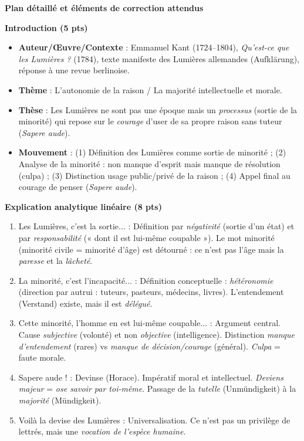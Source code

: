 \documentclass[11pt]{article}
\newcommand{\cle}[1]{{\popxbold\color{popdark}#1}}
\begin{document}
\begin{corrige} 
\textbf{Plan détaillé et éléments de correction attendus}

\textbf{Introduction (5 pts)}\par
\begin{itemize}
\item \textbf{Auteur/Œuvre/Contexte} : Emmanuel Kant (1724–1804), \emph{Qu'est-ce que les Lumières ?} (1784), texte manifeste des Lumières allemandes (Aufklärung), réponse à une revue berlinoise.
\item \textbf{Thème} : L'autonomie de la raison / La majorité intellectuelle et morale.
\item \textbf{Thèse} : Les Lumières ne sont pas une époque mais un \emph{processus} (sortie de la minorité) qui repose sur le \emph{courage} d'user de sa propre raison sans tuteur (\emph{Sapere aude}).
\item \textbf{Mouvement} : (1) Définition des Lumières comme sortie de minorité ; (2) Analyse de la minorité : non manque d'esprit mais manque de résolution (culpa) ; (3) Distinction usage public/privé de la raison ; (4) Appel final au courage de penser (\emph{Sapere aude}).
\end{itemize}

\textbf{Explication analytique linéaire (8 pts)}\par
\begin{enumerate}
\item \guillemotleft Les Lumières, c'est la sortie... \guillemotright : Définition par \emph{négativité} (sortie d'un état) et par \emph{responsabilité} (« dont il est lui-même coupable »). Le mot \cle{minorité} (minorité civile = minorité d'âge) est détourné : ce n'est pas l'âge mais la \emph{paresse} et la \emph{lâcheté}.
\item \guillemotleft La minorité, c'est l'incapacité... \guillemotright : Définition conceptuelle : \emph{hétéronomie} (direction par autrui : tuteurs, pasteurs, médecins, livres). L'entendement (Verstand) existe, mais il est \emph{délégué}.
\item \guillemotleft Cette minorité, l'homme en est lui-même coupable... \guillemotright : Argument central. Cause \emph{subjective} (volonté) et non \emph{objective} (intelligence). Distinction \emph{manque d'entendement} (rares) vs \emph{manque de décision/courage} (général). \emph{Culpa} = faute morale.
\item \guillemotleft Sapere aude ! \guillemotright : Devinse (Horace). Impératif moral et intellectuel. \emph{Deviens majeur} = \emph{ose savoir par toi-même}. Passage de la \emph{tutelle} (Unmündigkeit) à la \emph{majorité} (Mündigkeit).
\item \guillemotleft Voilà la devise des Lumières \guillemotright : Universalisation. Ce n'est pas un privilège de lettrés, mais une \emph{vocation de l'espèce humaine}.
\end{enumerate}


\end{corrige}
\end{document}
